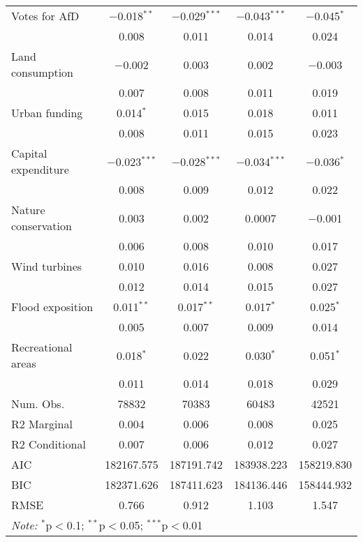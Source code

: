\begin{table}
\begin{tabular}[t]{lcccc}
Votes for AfD & \num{-0.018}$^{**}$ & \num{-0.029}$^{***}$ & \num{-0.043}$^{***}$ & \num{-0.045}$^{*}$\\
 & \num{0.008} & \num{0.011} & \num{0.014} & \num{0.024}\\
Land consumption & \num{-0.002} & \num{0.003} & \num{0.002} & \num{-0.003}\\
 & \num{0.007} & \num{0.008} & \num{0.011} & \num{0.019}\\
Urban funding & \num{0.014}$^{*}$ & \num{0.015} & \num{0.018} & \num{0.011}\\
 & \num{0.008} & \num{0.011} & \num{0.015} & \num{0.023}\\
Capital expenditure & \num{-0.023}$^{***}$ & \num{-0.028}$^{***}$ & \num{-0.034}$^{***}$ & \num{-0.036}$^{*}$\\
 & \num{0.008} & \num{0.009} & \num{0.012} & \num{0.022}\\
Nature conservation & \num{0.003} & \num{0.002} & \num{0.0007} & \num{-0.001}\\
 & \num{0.006} & \num{0.008} & \num{0.010} & \num{0.017}\\
Wind turbines & \num{0.010} & \num{0.016} & \num{0.008} & \num{0.027}\\
 & \num{0.012} & \num{0.014} & \num{0.015} & \num{0.027}\\
Flood exposition & \num{0.011}$^{**}$ & \num{0.017}$^{**}$ & \num{0.017}$^{*}$ & \num{0.025}$^{*}$\\
 & \num{0.005} & \num{0.007} & \num{0.009} & \num{0.014}\\
Recreational areas & \num{0.018}$^{*}$ & \num{0.022} & \num{0.030}$^{*}$ & \num{0.051}$^{*}$\\
 & \num{0.011} & \num{0.014} & \num{0.018} & \num{0.029}\\
\midrule
Num. Obs. & \num{78832} & \num{70383} & \num{60483} & \num{42521}\\
R2 Marginal & \num{0.004} & \num{0.006} & \num{0.008} & \num{0.025}\\
R2 Conditional & \num{0.007} & \num{0.006} & \num{0.012} & \num{0.027}\\
AIC & \num{182167.575} & \num{187191.742} & \num{183938.223} & \num{158219.830}\\
BIC & \num{182371.626} & \num{187411.623} & \num{184136.446} & \num{158444.932}\\
RMSE & \num{0.766} & \num{0.912} & \num{1.103} & \num{1.547}\\
\bottomrule
\multicolumn{5}{l}{\rule{0pt}{1em}\textit{Note: } $^{*}$p$<$0.1; $^{**}$p$<$0.05; $^{***}$p$<$0.01}\\
\end{tabular}
\end{table}